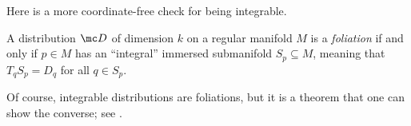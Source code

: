 \documentclass[../notes.tex]{subfiles}
\begin{document}
Here is a more coordinate-free check for being integrable.
\begin{definition}[foliation]
	A distribution $\mc D$ of dimension $k$ on a regular manifold $M$ is a \textit{foliation} if and only if $p\in M$ has an ``integral'' immersed submanifold $S_p\subseteq M$, meaning that $T_qS_p=D_q$ for all $q\in S_p$.
\end{definition}
Of course, integrable distributions are foliations, but it is a theorem that one can show the converse; see \cite[Theorem~19.12]{lee-manifolds}.
\end{document}
